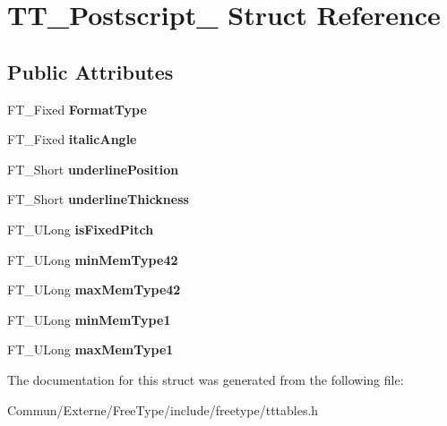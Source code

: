 \hypertarget{struct_t_t___postscript__}{}\section{T\+T\+\_\+\+Postscript\+\_\+ Struct Reference}
\label{struct_t_t___postscript__}
\subsection*{Public Attributes}
\begin{DoxyCompactItemize}
\item 
F\+T\+\_\+\+Fixed {\bfseries Format\+Type}\hypertarget{struct_t_t___postscript___a5ed6585c01fa4ffc3f8537d58bdd955f}{}\label{struct_t_t___postscript___a5ed6585c01fa4ffc3f8537d58bdd955f}

\item 
F\+T\+\_\+\+Fixed {\bfseries italic\+Angle}\hypertarget{struct_t_t___postscript___adcca36c7fbcbdff00fc8c2884a215830}{}\label{struct_t_t___postscript___adcca36c7fbcbdff00fc8c2884a215830}

\item 
F\+T\+\_\+\+Short {\bfseries underline\+Position}\hypertarget{struct_t_t___postscript___a909fd5064ab7547bb8ed984b5dfe2fe2}{}\label{struct_t_t___postscript___a909fd5064ab7547bb8ed984b5dfe2fe2}

\item 
F\+T\+\_\+\+Short {\bfseries underline\+Thickness}\hypertarget{struct_t_t___postscript___a4e4654766a4f27054c9a35958515e186}{}\label{struct_t_t___postscript___a4e4654766a4f27054c9a35958515e186}

\item 
F\+T\+\_\+\+U\+Long {\bfseries is\+Fixed\+Pitch}\hypertarget{struct_t_t___postscript___ab9a537994be4f81cb35f61f83cd97949}{}\label{struct_t_t___postscript___ab9a537994be4f81cb35f61f83cd97949}

\item 
F\+T\+\_\+\+U\+Long {\bfseries min\+Mem\+Type42}\hypertarget{struct_t_t___postscript___ad78af4931654c197d4a8d0f04d473885}{}\label{struct_t_t___postscript___ad78af4931654c197d4a8d0f04d473885}

\item 
F\+T\+\_\+\+U\+Long {\bfseries max\+Mem\+Type42}\hypertarget{struct_t_t___postscript___a70c4ba372d04e686208f0fede9885314}{}\label{struct_t_t___postscript___a70c4ba372d04e686208f0fede9885314}

\item 
F\+T\+\_\+\+U\+Long {\bfseries min\+Mem\+Type1}\hypertarget{struct_t_t___postscript___a91a8b40f60e67a1920209e6b08355848}{}\label{struct_t_t___postscript___a91a8b40f60e67a1920209e6b08355848}

\item 
F\+T\+\_\+\+U\+Long {\bfseries max\+Mem\+Type1}\hypertarget{struct_t_t___postscript___a944a3df5127262db0f7ae92868defb99}{}\label{struct_t_t___postscript___a944a3df5127262db0f7ae92868defb99}

\end{DoxyCompactItemize}


The documentation for this struct was generated from the following file\+:\begin{DoxyCompactItemize}
\item 
Commun/\+Externe/\+Free\+Type/include/freetype/tttables.\+h\end{DoxyCompactItemize}
